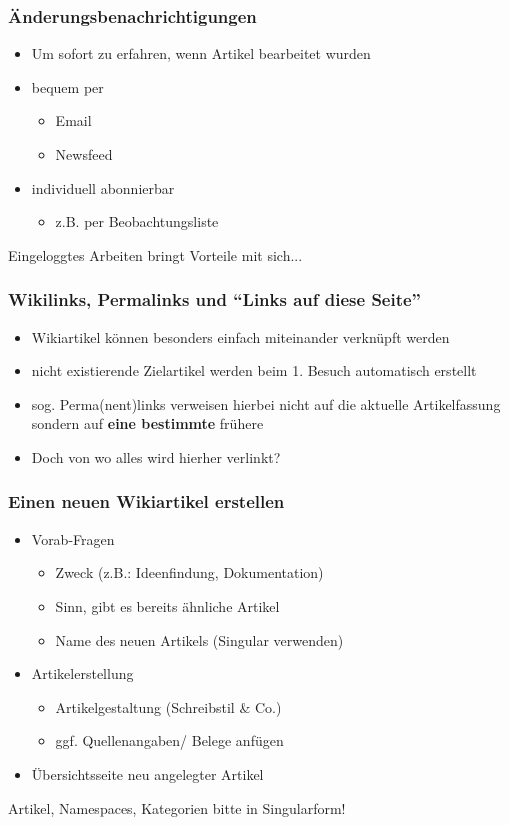 \documentclass{beamer}
\begin{document}
\begin{frame}
  \frametitle{Änderungsbenachrichtigungen}
  \begin{itemize}
    \item Um sofort zu erfahren, wenn Artikel bearbeitet wurden
    \item bequem per
    \begin{itemize}
      \item Email
      \item Newsfeed
    \end{itemize}
    \item individuell abonnierbar
    \begin{itemize}
      \item z.B. per Beobachtungsliste
    \end{itemize}
  \end{itemize}
  Eingeloggtes Arbeiten bringt Vorteile mit sich...
\end{frame}

\begin{frame}
  \frametitle{Wikilinks, Permalinks und “Links auf diese Seite”}
  \begin{itemize}
    \item Wikiartikel können besonders einfach miteinander verknüpft werden
    \item nicht existierende Zielartikel werden beim 1. Besuch automatisch erstellt
    \item sog. Perma(nent)links verweisen hierbei nicht auf die aktuelle Artikelfassung sondern auf \textbf{eine bestimmte} frühere
    \item Doch von wo alles wird hierher verlinkt?
  \end{itemize}
\end{frame}


\begin{frame}
  \frametitle{Einen neuen Wikiartikel erstellen}
  \begin{itemize}
    \item Vorab-Fragen
    \begin{itemize}
      \item Zweck (z.B.: Ideenfindung, Dokumentation)
      \item Sinn, gibt es bereits ähnliche Artikel
      \item Name des neuen Artikels (Singular verwenden)
    \end{itemize}
    \item Artikelerstellung
    \begin{itemize}
      \item Artikelgestaltung (Schreibstil \& Co.)
      \item ggf. Quellenangaben/ Belege anfügen
    \end{itemize}
    \item Übersichtsseite neu angelegter Artikel
  \end{itemize}
  Artikel, Namespaces, Kategorien bitte in Singularform!
\end{frame}
\end{document}
